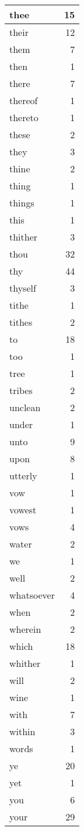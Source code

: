 \begin{center}
\begin{longtable}{l|r}
thee & 15 \\ \hline
their & 12 \\ \hline
them & 7 \\ \hline
then & 1 \\ \hline
there & 7 \\ \hline
thereof & 1 \\ \hline
thereto & 1 \\ \hline
these & 2 \\ \hline
they & 3 \\ \hline
thine & 2 \\ \hline
thing & 1 \\ \hline
things & 1 \\ \hline
this & 1 \\ \hline
thither & 3 \\ \hline
thou & 32 \\ \hline
thy & 44 \\ \hline
thyself & 3 \\ \hline
tithe & 1 \\ \hline
tithes & 2 \\ \hline
to & 18 \\ \hline
too & 1 \\ \hline
tree & 1 \\ \hline
tribes & 2 \\ \hline
unclean & 2 \\ \hline
under & 1 \\ \hline
unto & 9 \\ \hline
upon & 8 \\ \hline
utterly & 1 \\ \hline
vow & 1 \\ \hline
vowest & 1 \\ \hline
vows & 4 \\ \hline
water & 2 \\ \hline
we & 1 \\ \hline
well & 2 \\ \hline
whatsoever & 4 \\ \hline
when & 2 \\ \hline
wherein & 2 \\ \hline
which & 18 \\ \hline
whither & 1 \\ \hline
will & 2 \\ \hline
wine & 1 \\ \hline
with & 7 \\ \hline
within & 3 \\ \hline
words & 1 \\ \hline
ye & 20 \\ \hline
yet & 1 \\ \hline
you & 6 \\ \hline
your & 29 \\ \hline
\end{longtable}
\end{center}



